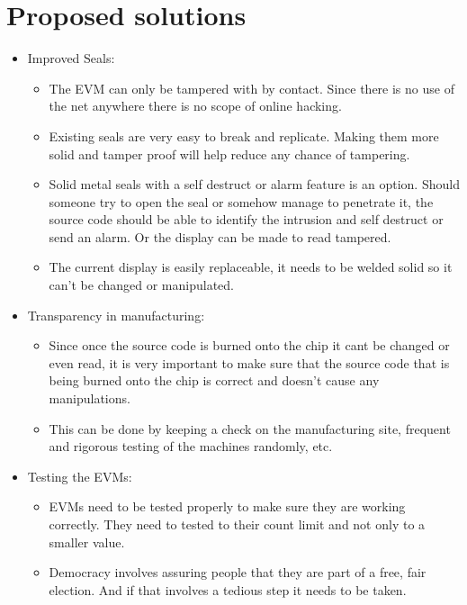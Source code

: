 \documentclass[a4paper,11pt]{article}
\begin{document}
\section{Proposed solutions}
\begin{itemize}
    \item Improved Seals:
    \begin{itemize}
        \item The EVM can only be tampered with by contact. Since there is no use of the net anywhere there is no scope of online hacking. 
        \item Existing seals are very easy to break and replicate. Making them more solid and tamper proof will help reduce any chance of tampering.
        \item Solid metal seals with a self destruct or alarm feature is an option. Should someone try to open the seal or somehow manage to penetrate it, the source code should be able to identify the intrusion and self destruct or send an alarm. Or the display can be made to read tampered. 
        \item The current display is easily replaceable, it needs to be welded solid so it can't be changed or manipulated. 
    \end{itemize}
    
    \item Transparency in manufacturing:
    \begin{itemize}
        \item Since once the source code is burned onto the chip it cant be changed or even read, it is very important to make sure that the source code that is being burned onto the chip is correct and doesn't cause any manipulations. 
        \item This can be done by keeping a check on the manufacturing site, frequent and rigorous testing of the machines randomly, etc.
    \end{itemize}
    
    \item Testing the EVMs:
    \begin{itemize}
        \item EVMs need to be tested properly to make sure they are working correctly. They need to tested to their count limit and not only to a smaller value. 
        \item Democracy involves assuring people that they are part of a free, fair election. And if that involves a tedious step it needs to be taken. 
    \end{itemize}
    

\end{itemize}
\end{document}
